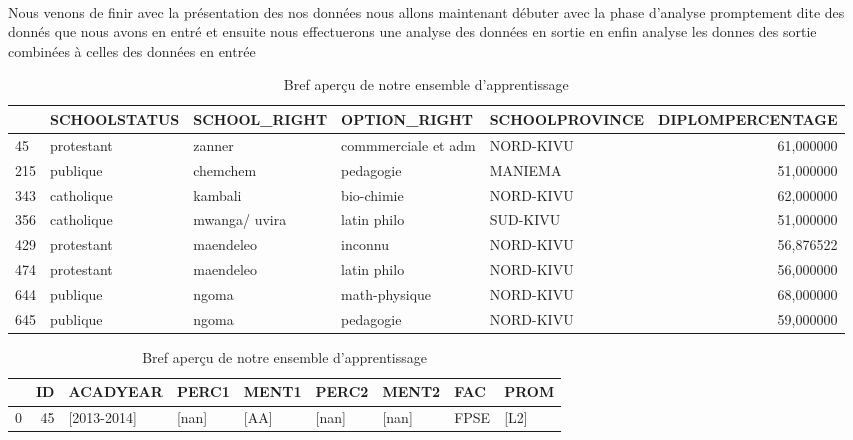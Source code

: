 \paragraph{}
Nous venons de finir avec la présentation des nos données nous allons
maintenant débuter avec la phase d'analyse promptement dite  des donnés que nous avons en entré et ensuite nous effectuerons  une analyse des données en
sortie en enfin analyse les donnes des sortie combinées à celles des données  en entrée
\begin{table}
	\centering
	\begingroup %
	\captionsetup{type=table} %
	\caption{Bref aperçu de notre ensemble d'apprentissage }
	\label{tab:Dataset}
	\begin{tabular}{lllllr}
		\toprule
		{} & SCHOOLSTATUS &   SCHOOL\_RIGHT &         OPTION\_RIGHT & SCHOOLPROVINCE &  DIPLOMPERCENTAGE \\
		\midrule
		45  &   protestant &         zanner &  commmerciale et adm &      NORD-KIVU &         61,000000 \\
		215 &     publique &       chemchem &            pedagogie &        MANIEMA &         51,000000 \\
		343 &   catholique &        kambali &           bio-chimie &      NORD-KIVU &         62,000000 \\
		356 &   catholique &  mwanga/ uvira &          latin philo &       SUD-KIVU &         51,000000 \\
		429 &   protestant &      maendeleo &              inconnu &      NORD-KIVU &         56,876522 \\
		474 &   protestant &      maendeleo &          latin philo &      NORD-KIVU &         56,000000 \\
		644 &     publique &          ngoma &        math-physique &      NORD-KIVU &         68,000000 \\
		645 &     publique &          ngoma &            pedagogie &      NORD-KIVU &         59,000000 \\
		\bottomrule
	\end{tabular}
	\begin{tabular}{lrlllllll}
	\toprule
	{} &   ID &                ACADYEAR &                  PERC1 &     MENT1 &                 PERC2 &       MENT2 &   FAC &      PROM \\
	\midrule
	0 &   45 &             [2013-2014] &                  [nan] &      [AA] &                 [nan] &       [nan] &  FPSE &      [L2] \\

\end{tabular}
\end{table}
